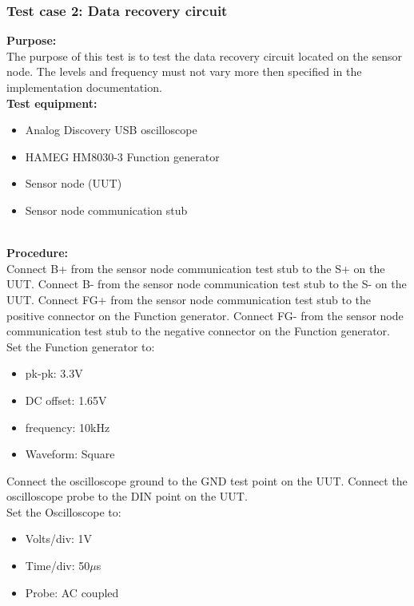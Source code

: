 \subsubsection{Test case 2: Data recovery circuit}
\textbf{Purpose:}\\
The purpose of this test is to test the data recovery circuit located on the sensor node.  The levels and frequency must not vary more then specified in the implementation documentation.\\

\textbf{Test equipment:}
\begin{itemize}
\item Analog Discovery USB oscilloscope
\item HAMEG HM8030-3 Function generator
\item Sensor node (UUT)
\item Sensor node communication stub
\end{itemize}
\ \\
\textbf{Procedure:}\\
Connect B+ from the sensor node communication test stub to the S+ on the UUT. Connect B- from the sensor node communication test stub to the S- on the UUT.
Connect FG+ from the sensor node communication test stub to the positive connector on the Function generator. Connect FG- from the sensor node communication test stub to the negative connector on the Function generator.\\ Set the Function generator to:
\begin{itemize}
\item pk-pk: 3.3V
\item DC offset: 1.65V
\item frequency: 10kHz
\item Waveform: Square
\end{itemize}
Connect the oscilloscope ground to the GND test point on the UUT.
Connect the oscilloscope probe to the DIN point on the UUT.\\
Set the Oscilloscope to:
\begin{itemize}
\item Volts/div: 1V
\item Time/div: 50$\mu$s
\item Probe: AC coupled
\end{itemize}
